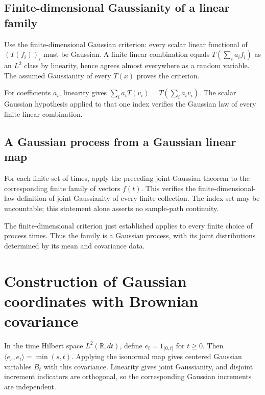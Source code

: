 \documentclass[11pt,a4paper]{report}
\begin{document}
\subsection{\texorpdfstring{Finite-dimensional Gaussianity of a linear family}{Finite-dimensional Gaussianity of a linear family}}
\label{report-step-UnadjustedLangevin-GaussianLinearProcess-lean-1}


Use the finite-dimensional Gaussian criterion: every scalar linear functional of \((T(f_i))_i\) must be Gaussian. A finite linear combination equals \(T(\sum_i a_if_i)\) as an \(L^2\) class by linearity, hence agrees almost everywhere as a random variable. The assumed Gaussianity of every \(T(x)\) proves the criterion.



For coefficients \(a_i\), linearity gives \(\sum_i a_iT(v_i)=T(\sum_i a_iv_i)\). The scalar Gaussian hypothesis applied to that one index verifies the Gaussian law of every finite linear combination.

\subsection{\texorpdfstring{A Gaussian process from a Gaussian linear map}{A Gaussian process from a Gaussian linear map}}
\label{report-step-UnadjustedLangevin-GaussianLinearProcess-lean-2}


For each finite set of times, apply the preceding joint-Gaussian theorem to the corresponding finite family of vectors \(f(t)\). This verifies the finite-dimensional-law definition of joint Gaussianity of every finite collection. The index set may be uncountable; this statement alone asserts no sample-path continuity.



The finite-dimensional criterion just established applies to every finite choice of process times. Thus the family is a Gaussian process, with its joint distributions determined by its mean and covariance data.

\section{\texorpdfstring{Construction of Gaussian coordinates with Brownian covariance}{Construction of Gaussian coordinates with Brownian covariance}}
\label{proof-module-UnadjustedLangevin-CanonicalBrownian-lean}


In the time Hilbert space \(L^2(\mathbb R,dt)\), define \(e_t=1_{(0,t]}\) for \(t\ge0\). Then \(\langle e_s,e_t\rangle=\min(s,t)\). Applying the isonormal map gives centered Gaussian variables \(B_t\) with this covariance. Linearity gives joint Gaussianity, and disjoint increment indicators are orthogonal, so the corresponding Gaussian increments are independent.
\end{document}

